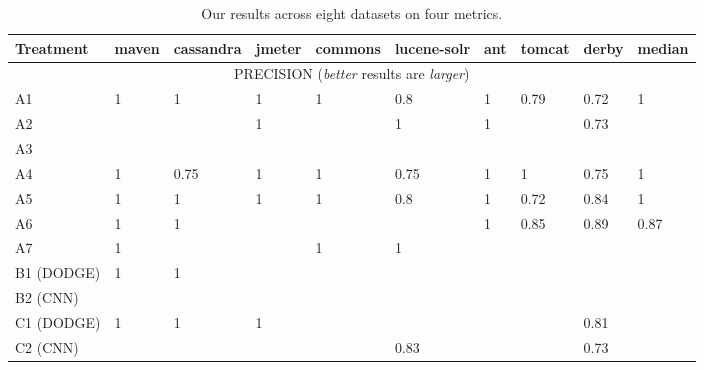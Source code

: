 \begin{table*}[t]
\renewcommand{\baselinestretch}{.5}
{ 
   
    \caption{Our results across eight datasets on four metrics.}
    \label{tab:results}
   \scriptsize

    \begin{center}
    \begin{tabular}{l|llllllll|l}
    
        \toprule   
        \textbf{Treatment} & \textbf{maven} & \textbf{cassandra} & \textbf{jmeter} & \textbf{commons} & \textbf{lucene-solr} & \textbf{ant} & \textbf{tomcat} & \textbf{derby} & \textbf{median} \\
        \midrule
        \multicolumn{10}{c}{PRECISION  ({\em better} results are {\em larger})} \\
        \midrule
A1                      & 1   & 1    & 1    & 1    & 0.8  & 1    & 0.79 & 0.72 & 1             \\
A2                      & \bad 0   & \bad 0.25 & 1    & \bad 0.67 & 1    & 1    & \bad 0.68 & 0.73 & \bad 0.71          \\
A3                      & \bad 0.5 & \bad 0.25 & \bad 0.33 & \bad 0.2  & \bad 0.25 & \bad 0.33 & \bad 0.33 & \bad 0.4  & \bad 0.33          \\
A4                      & 1   & 0.75 & 1    & 1    & 0.75 & 1    & 1    & 0.75 & 1             \\
A5                      & 1   & 1    & 1    & 1    & 0.8  & 1    & 0.72 & 0.84 & 1             \\
A6                      & 1   & 1    & \bad 0.5  & \bad 0.33 & \bad 0.67 & 1    & 0.85 & 0.89 & 0.87 \\
A7                      & 1   & \bad 0.5  & \bad 0.5  & 1    & 1    & \bad 0    & \bad 0.55 & \bad 0.42 & \bad 0.53          \\
B1 (DODGE)              & 1   & 1    & \bad 0    & \bad 0.5  & \bad 0    & \bad 0    & \bad 0.47 & \bad 0.59 & \bad 0.49          \\
B2 (CNN)                & \bad 0.5 & \bad 0    & \bad 0    & \bad 0.6  & \bad 0    & \bad 0.29 & \bad 0.51 & \bad 0.61 & \bad 0.4           \\
C1 (DODGE)              & 1   & 1    & 1    & \bad 0.33 & \bad 0.67 & \bad 0.67 & \bad 0.67 & 0.81 & \bad 0.74          \\
C2 (CNN)                & \bad 0.5 & \bad 0.5  & \bad 0.5  & \bad 0.6  & 0.83 & \bad 0.43 & \bad 0.4  & 0.73 & \bad 0.5           \\

\end{tabular}
\end{center}}
\end{table*}
